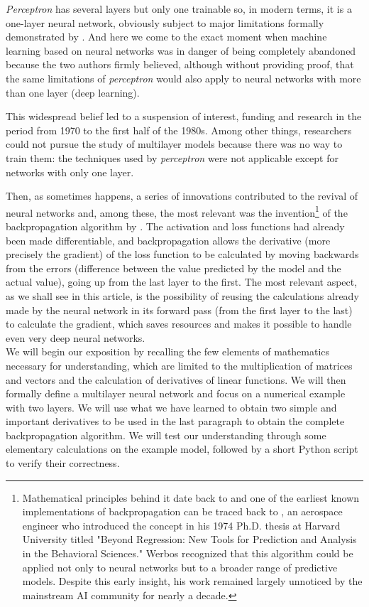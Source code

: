 \documentclass{article}
\newcommand{\authornote}{
Mathematical principles behind it date back to \textcite{kelley1960} and one of the earliest known implementations of backpropagation can be traced back to \textcite{werbos1974}, an aerospace engineer who introduced the concept in his 1974 Ph.D. thesis at Harvard University titled "Beyond Regression: New Tools for Prediction and Analysis in the Behavioral Sciences." Werbos recognized that this algorithm could be applied not only to neural networks but to a broader range of predictive models. Despite this early insight, his work remained largely unnoticed by the mainstream AI community for nearly a decade.}
\begin{document}
 \textit{Perceptron} has several layers but only one trainable so, in modern terms, it is a one-layer neural network, obviously subject to major limitations formally demonstrated by \textcite{minsky69perceptrons}. And here we come to the exact moment when machine learning based on neural networks was in danger of being completely abandoned because the two authors firmly believed, although without providing proof, that the same limitations of \textit{perceptron} would also apply to neural networks with more than one layer (deep learning).

 This widespread belief led to a suspension of interest, funding and research in the period from 1970 to the first half of the 1980s. Among other things, researchers could not pursue the study of multilayer models because there was no way to train them: the techniques used by \textit{perceptron} were not applicable except for networks with only one layer.

 Then, as sometimes happens, a series of innovations contributed to the revival of neural networks and, among these, the most relevant was the invention\footnote{\authornote} of the backpropagation algorithm by \textcite{rumelhart1986}. The activation and loss functions had already been made differentiable, and backpropagation allows the derivative (more precisely the gradient) of the loss function to be calculated by moving backwards from the errors (difference between the value predicted by the model and the actual value), going up from the last layer to the first. The most relevant aspect, as we shall see in this article, is the possibility of reusing the calculations already made by the neural network in its forward pass (from the first layer to the last) to calculate the gradient, which saves resources and makes it possible to handle even very deep neural networks.\\

 We will begin our exposition by recalling the few elements of mathematics necessary for understanding, which are limited to the multiplication of matrices and vectors and the calculation of derivatives of linear functions. We will then formally define a multilayer neural network and focus on a numerical example with two layers. We will use what we have learned to obtain two simple and important derivatives to be used in the last paragraph to obtain the complete backpropagation algorithm. We will test our understanding through some elementary calculations on the example model, followed by a short Python script to verify their correctness.
\end{document}
